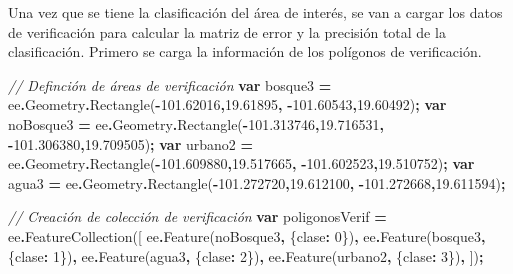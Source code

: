 \documentclass[
  12pt,
  letterpaper,
  twoside]{book}
\newenvironment{Shaded}{\begin{snugshade}}{\end{snugshade}}
\newcommand{\AttributeTok}[1]{\textcolor[rgb]{0.77,0.63,0.00}{#1}}
\newcommand{\CommentTok}[1]{\textcolor[rgb]{0.56,0.35,0.01}{\textit{#1}}}
\newcommand{\DecValTok}[1]{\textcolor[rgb]{0.00,0.00,0.81}{#1}}
\newcommand{\FloatTok}[1]{\textcolor[rgb]{0.00,0.00,0.81}{#1}}
\newcommand{\FunctionTok}[1]{\textcolor[rgb]{0.00,0.00,0.00}{#1}}
\newcommand{\KeywordTok}[1]{\textcolor[rgb]{0.13,0.29,0.53}{\textbf{#1}}}
\newcommand{\NormalTok}[1]{#1}
\newcommand{\OperatorTok}[1]{\textcolor[rgb]{0.81,0.36,0.00}{\textbf{#1}}}
\newcommand{\StringTok}[1]{\textcolor[rgb]{0.31,0.60,0.02}{#1}}
\begin{document}
Una vez que se tiene la clasificación del área de interés, se van a cargar los datos de verificación para calcular la matriz de error y la precisión total de la clasificación. Primero se carga la información de los polígonos de verificación.

\begin{Shaded}
\begin{Highlighting}[]
\CommentTok{// Definción de áreas de verificación}
\KeywordTok{var}\NormalTok{ bosque3 }\OperatorTok{=}\NormalTok{ ee}\OperatorTok{.}\AttributeTok{Geometry}\OperatorTok{.}\FunctionTok{Rectangle}\NormalTok{(}\OperatorTok{{-}}\FloatTok{101.62016}\OperatorTok{,}\FloatTok{19.61895}\OperatorTok{,} 
  \OperatorTok{{-}}\FloatTok{101.60543}\OperatorTok{,}\FloatTok{19.60492}\NormalTok{)}\OperatorTok{;}
\KeywordTok{var}\NormalTok{ noBosque3 }\OperatorTok{=}\NormalTok{ ee}\OperatorTok{.}\AttributeTok{Geometry}\OperatorTok{.}\FunctionTok{Rectangle}\NormalTok{(}\OperatorTok{{-}}\FloatTok{101.313746}\OperatorTok{,}\FloatTok{19.716531}\OperatorTok{,} 
  \OperatorTok{{-}}\FloatTok{101.306380}\OperatorTok{,}\FloatTok{19.709505}\NormalTok{)}\OperatorTok{;}
\KeywordTok{var}\NormalTok{ urbano2 }\OperatorTok{=}\NormalTok{ ee}\OperatorTok{.}\AttributeTok{Geometry}\OperatorTok{.}\FunctionTok{Rectangle}\NormalTok{(}\OperatorTok{{-}}\FloatTok{101.609880}\OperatorTok{,}\FloatTok{19.517665}\OperatorTok{,} 
  \OperatorTok{{-}}\FloatTok{101.602523}\OperatorTok{,}\FloatTok{19.510752}\NormalTok{)}\OperatorTok{;}
\KeywordTok{var}\NormalTok{ agua3 }\OperatorTok{=}\NormalTok{ ee}\OperatorTok{.}\AttributeTok{Geometry}\OperatorTok{.}\FunctionTok{Rectangle}\NormalTok{(}\OperatorTok{{-}}\FloatTok{101.272720}\OperatorTok{,}\FloatTok{19.612100}\OperatorTok{,} 
  \OperatorTok{{-}}\FloatTok{101.272668}\OperatorTok{,}\FloatTok{19.611594}\NormalTok{)}\OperatorTok{;}

\CommentTok{// Creación de colección de verificación}
\KeywordTok{var}\NormalTok{ poligonosVerif }\OperatorTok{=}\NormalTok{ ee}\OperatorTok{.}\FunctionTok{FeatureCollection}\NormalTok{([}
\NormalTok{  ee}\OperatorTok{.}\FunctionTok{Feature}\NormalTok{(noBosque3}\OperatorTok{,}\NormalTok{ \{}\StringTok{\textquotesingle{}clase\textquotesingle{}}\OperatorTok{:} \DecValTok{0}\NormalTok{\})}\OperatorTok{,}
\NormalTok{  ee}\OperatorTok{.}\FunctionTok{Feature}\NormalTok{(bosque3}\OperatorTok{,}\NormalTok{ \{}\StringTok{\textquotesingle{}clase\textquotesingle{}}\OperatorTok{:} \DecValTok{1}\NormalTok{\})}\OperatorTok{,}
\NormalTok{  ee}\OperatorTok{.}\FunctionTok{Feature}\NormalTok{(agua3}\OperatorTok{,}\NormalTok{ \{}\StringTok{\textquotesingle{}clase\textquotesingle{}}\OperatorTok{:} \DecValTok{2}\NormalTok{\})}\OperatorTok{,}
\NormalTok{  ee}\OperatorTok{.}\FunctionTok{Feature}\NormalTok{(urbano2}\OperatorTok{,}\NormalTok{ \{}\StringTok{\textquotesingle{}clase\textquotesingle{}}\OperatorTok{:} \DecValTok{3}\NormalTok{\})}\OperatorTok{,}
\NormalTok{])}\OperatorTok{;}
\end{Highlighting}
\end{Shaded}
\end{document}
